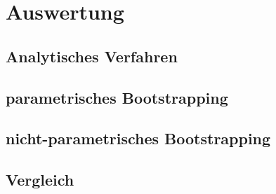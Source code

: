 \chapter{Auswertung}
\label{chapter:kap5}

\section{Analytisches Verfahren}

\section{parametrisches Bootstrapping}

\section{nicht-parametrisches Bootstrapping}

\section{Vergleich}
